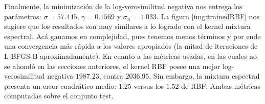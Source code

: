 \documentclass[letterpaper,11pt,oneside]{article}
\theoremstyle{break}
\begin{document}
Finalmente, la minimización de la log-verosimilitud negativa nos entrega los parámetros: $\sigma = 57.445$, $\gamma = 0.1569$ y $\sigma_n = 1.033$. La figura \ref{img:trainedRBF} nos sugiere que los resultados son muy similares a lo logrado con el kernel mixtura espectral. Acá ganamos en complejidad, pues tenemos menos términos y por ende una convergencia más rápida a los valores apropiados (la mitad de iteraciones de L-BFGS-B aproximadamente). En cuanto a las métricas usadas, en las cuales no se ahondó en las secciones anteriores, el kernel RBF posee una mejor log-verosimilitud negativa $1987.23$, contra $2036.95$. Sin embargo, la mixtura espectral presenta un error cuadrático medio: $1.25$ versus los $1.52$ de RBF. Ambas métricas computadas sobre el conjunto test.



\end{document}
